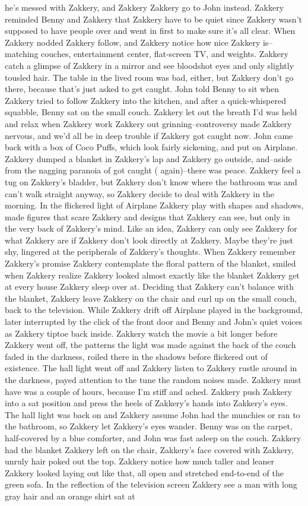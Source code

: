 \documentclass[12pt]{book}
\begin{document}
he's messed with Zakkery, and Zakkery Zakkery go to John instead. Zakkery reminded Benny and Zakkery that Zakkery have to be quiet since Zakkery wasn't supposed to have people over and went in first to make sure it's all clear. When Zakkery nodded Zakkery follow, and Zakkery notice how nice Zakkery is--matching couches, entertainment center, flat-screen TV, and weights. Zakkery catch a glimpse of Zakkery in a mirror and see bloodshot eyes and only slightly tousled hair. The table in the lived room was bad, either, but Zakkery don't go there, because that's just asked to get caught. John told Benny to sit when Zakkery tried to follow Zakkery into the kitchen, and after a quick-whispered squabble, Benny sat on the small couch. Zakkery let out the breath I'd was held and relax when Zakkery work Zakkery out grinning--controversy made Zakkery nervous, and we'd all be in deep trouble if Zakkery got caught now. John came back with a box of Coco Puffs, which look fairly sickening, and put on Airplane. Zakkery dumped a blanket in Zakkery's lap and Zakkery go outside, and--aside from the nagging paranoia of got caught ( again)--there was peace. Zakkery feel a tug on Zakkery's bladder, but Zakkery don't know where the bathroom was and can't walk straight anyway, so Zakkery decide to deal with Zakkery in the morning. In the flickered light of Airplane Zakkery play with shapes and shadows, made figures that scare Zakkery and designs that Zakkery can see, but only in the very back of Zakkery's mind. Like an idea, Zakkery can only see Zakkery for what Zakkery are if Zakkery don't look directly at Zakkery. Maybe they're just shy, lingered at the peripherals of Zakkery's thoughts. When Zakkery remember Zakkery's promise Zakkery contemplate the floral pattern of the blanket, smiled when Zakkery realize Zakkery looked almost exactly like the blanket Zakkery get at every house Zakkery sleep over at. Deciding that Zakkery can't balance with the blanket, Zakkery leave Zakkery on the chair and curl up on the small couch, back to the television. While Zakkery drift off Airplane played in the background, later interrupted by the click of the front door and Benny and John's quiet voices as Zakkery tiptoe back inside. Zakkery watch the movie a bit longer before Zakkery went off, the patterns the light was made against the back of the couch faded in the darkness, roiled there in the shadows before flickered out of existence. The hall light went off and Zakkery listen to Zakkery rustle around in the darkness, payed attention to the tune the random noises made. Zakkery must have was a couple of hours, because I'm stiff and ached. Zakkery push Zakkery into a sat position and press the heels of Zakkery's hands into Zakkery's eyes. The hall light was back on and Zakkery assume John had the munchies or ran to the bathroom, so Zakkery let Zakkery's eyes wander. Benny was on the carpet, half-covered by a blue comforter, and John was fast asleep on the couch. Zakkery had the blanket Zakkery left on the chair, Zakkery's face covered with Zakkery, unruly hair poked out the top. Zakkery notice how much taller and leaner Zakkery looked laying out like that, all open and stretched end-to-end of the green sofa. In the reflection of the television screen Zakkery see a man with long gray hair and an orange shirt sat at 
\end{document}
